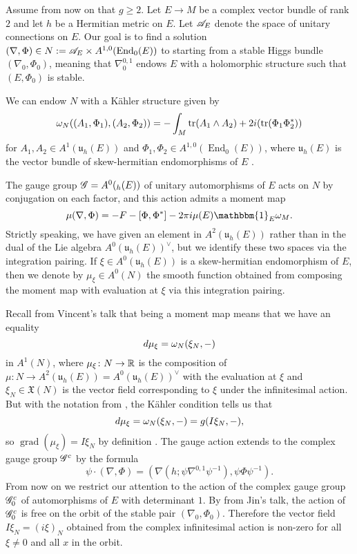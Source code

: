 \documentclass[A4paper, 12pt, british, reqno]{amsart}
\DeclareMathOperator{\End}{End}
\DeclareMathOperator{\tr}{tr}
\let\U\relax
\DeclareMathOperator{\U}{U}
\let\Im\relax
\DeclareMathOperator{\Im}{Im}
\DeclareMathOperator{\grad}{grad}
\newcommand{\dual}{^{\vee}}
\renewcommand{\X}{\mathfrak{X}}
\renewcommand{\u}{\mathfrak{u}}
\newcommand{\1}{\mathbbm{1}}
\begin{document}
Assume from now on that $g\geqslant 2$.
Let $E\to M$ be a complex vector bundle of rank $2$ and let $h$ be a Hermitian metric on $E$.
Let $\mathscr{A}_{E}$ denote the space of unitary connections on $E$.
Our goal is to find a solution $(\nabla,\Phi)\in N:=\sA_{E}\times A^{1,0}(\End_{0}(E))$ to  starting from a stable Higgs bundle $(\nabla_{0},\Phi_{0})$, meaning that $\nabla^{0,1}_{0}$ endows $E$ with a holomorphic structure such that $(E,\Phi_{0})$ is stable.

We can endow $N$ with a Kähler structure given by
\[ \w_{N}((A_{1},\Phi_{1}),(A_{2},\Phi_{2}))=-\int_{M}\tr(A_{1}\wedge A_{2})+2i\Im(\tr(\Phi_{1}\Phi_{2}^{*})) \]
for $A_{1},A_{2}\in A^{1}(\u_{h}(E))$ and $\Phi_{1},\Phi_{2}\in A^{1,0}(\End_{0}(E))$, where $\u_{h}(E)$ is the vector bundle of skew-hermitian endomorphisms of $E$ \cite[Corollary 4.2.11]{huy05}.

The gauge group $\G=A^{0}(\U_{h}(E))$ of unitary automorphisms of $E$ acts on $N$ by conjugation on each factor, and this action admits a moment map
\[ \mu(\nabla,\Phi)=-F-[\Phi,\Phi^{*}]-2\pi i \mu(E)\1_{E}\w_{M}. \]
Strictly speaking, we have given an element in $A^{2}(\u_{h}(E))$ rather than in the dual of the Lie algebra $A^{0}(\u_{h}(E))\dual$, but we identify these two spaces via the integration pairing.
If $\xi\in A^{0}(\u_{h}(E))$ is a skew-hermitian endomorphism of $E$, then we denote by $\mu_{\xi}\in A^{0}(N)$ the smooth function obtained from composing the moment map with evaluation at $\xi$ via this integration pairing.

Recall from Vincent's talk that being a moment map means that we have an equality
\[ d\mu_{\xi}=\omega_{N}(\xi_{N},-) \]
in $A^{1}(N)$, where $\mu_{\xi}\colon N\to \mathbb{R}$ is the composition of $\mu\colon N\to A^{2}(\u_{h}(E))=A^{0}(\u_{h}(E))\dual$ with the evaluation at $\xi$ and $\xi_{N}\in \X(N)$ is the vector field corresponding to $\xi$ under the infinitesimal action.
But with the notation from \cite[\S 3]{voi02}, the Kähler condition tells us that
\[ d\mu_{\xi}=\omega_{N}(\xi_{N},-)=g(I\xi_{N},-), \]
so $\grad(\mu_{\xi})=I\xi_{N}$ by definition \cite[p.~343]{lee13}.
The gauge action extends to the complex gauge group $\mathscr{G}^{c}$ by the formula
\[ \psi\cdot (\nabla,\Phi)=(\nabla(h;\psi\nabla^{0,1}\psi^{-1}),\psi\Phi \psi^{-1}). \]
From now on we restrict our attention to the action of the complex gauge group $\mathscr{G}^{c}_{0}$ of automorphisms of $E$ with determinant $1$.
By \cite[(3.15)]{hit87a} from Jin's talk, the action of $\mathscr{G}^{c}_{0}$ is free on the orbit of the stable pair $(\nabla_{0},\Phi_{0})$.
Therefore the vector field $I\xi_{N}=(i \xi)_{N}$ obtained from the complex infinitesimal action is non-zero for all $\xi\neq 0$ and all $x$ in the orbit.
\end{document}
